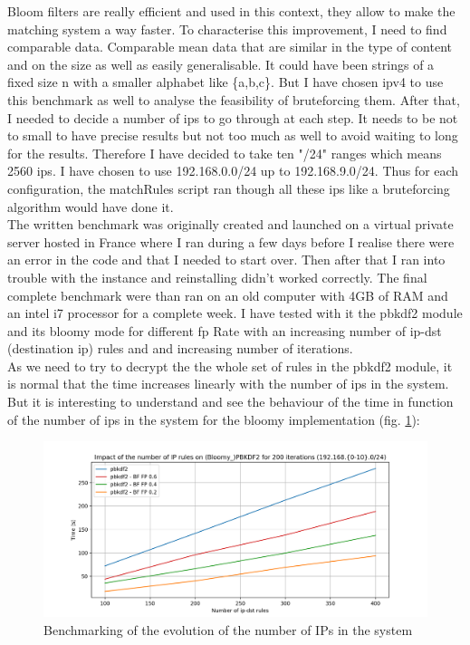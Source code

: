 \documentclass{eplmastersthesis}
\begin{document}
Bloom filters are really efficient and used in this context, they allow to make the matching system a way faster. To characterise this improvement, I need to find comparable data.
Comparable mean data that are similar in the type of content and on the size as well as easily generalisable. It could have been strings of a fixed size n with a smaller alphabet like \{a,b,c\}. But I have chosen \gls{ipv4} to use this benchmark as well to analyse the feasibility of  bruteforcing them.
After that, I needed to decide a number of \gls{ip}s to go through at each step. It needs to be not to small to have precise results but not too much as well to avoid waiting to long for the results. Therefore I have decided to take ten "/24" ranges which means 2560 \gls{ip}s. I have chosen to use 192.168.0.0/24 up to 192.168.9.0/24.
Thus for each configuration, the matchRules script ran though all these \gls{ip}s like a bruteforcing algorithm would have done it.\\

The written benchmark was originally created and launched on a virtual private server hosted in France where I ran during a few days before I realise there were an error in the code and that I needed to start over. Then after that I ran into trouble with the instance and reinstalling didn't worked correctly.
The final complete benchmark were than ran on an old computer with 4GB of RAM and an intel i7 processor for a complete week.
I have tested with it the \gls{pbkdf2} module and its bloomy mode for different \gls{fp} Rate with an increasing number of ip-dst (destination \gls{ip}) rules and and increasing number of iterations.\\

As we need to try to decrypt the the whole set of rules in the \gls{pbkdf2} module, it is normal that the time increases linearly with the number of \gls{ip}s in the system. But it is interesting to understand and see the behaviour of the time in function of the number of \gls{ip}s in the system for the bloomy implementation (fig. \ref{benchmarking:timeips}):

\begin{figure}[h!]
\begin{center}
	\includegraphics[scale=0.6]{res/TimeIPs}
	\caption{Benchmarking of the evolution of the number of IPs in the system}
	\label{benchmarking:timeips}
\end{center}
\end{figure}
\end{document}
